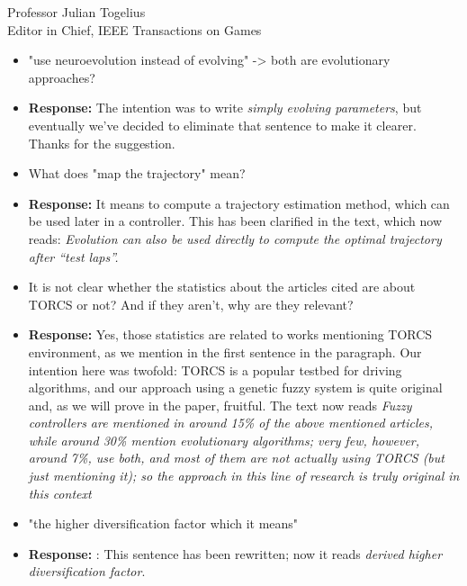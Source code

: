 \documentclass[10pt]{letter} %
\begin{document}
\begin{letter}{Professor Julian Togelius \\ Editor in Chief, IEEE Transactions on Games}
\begin{enumerate}
\begin{itemize}
\begin{itemize}
			\item "use neuroevolution instead of evolving" -> both are evolutionary approaches?
					\item {\bf Response:} The intention was to write {\em simply evolving parameters}, but eventually we've decided to eliminate that sentence to make it clearer. Thanks for the suggestion.
			\item What does "map the trajectory" mean?
					\item {\bf Response:} 
			It means to compute a trajectory estimation method, which can be used later in a controller. This has been clarified in the text, which now reads: {\em Evolution can also be used directly to compute the optimal trajectory after ``test laps''.}
			\item It is not clear whether the statistics about the articles cited are about TORCS or not? And if they aren't, why are they relevant?
\item {\bf Response:} 
			Yes, those statistics are related to works mentioning TORCS environment, as we mention in the first sentence in the paragraph. Our intention here was twofold: TORCS is a popular testbed for driving algorithms, and our approach using a genetic fuzzy system is quite original and, as we will prove in the paper, fruitful. The text now reads {\em Fuzzy controllers are mentioned in around 15\% of the above mentioned articles, while around 30\% mention evolutionary algorithms; very few, however, around 7\%, use both, and most of them are not actually using TORCS (but just mentioning it); so the approach in this line of research is truly original in this context}
				
			\item "the higher diversification factor which it means"
					\item {\bf Response:} : This sentence has been rewritten; now it reads  {\em  derived higher diversification factor}.
			\end{itemize}
	


\end{itemize}
\end{enumerate}
\end{letter}
\end{document}
